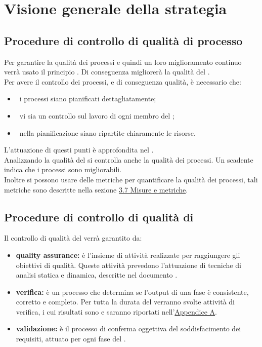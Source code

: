 
\section{Visione generale della strategia}
	\subsection{Procedure di controllo di qualità di processo}
		Per garantire la qualità dei processi e quindi un loro miglioramento continuo verrà usato il principio . Di conseguenza migliorerà la qualità del . \\
		Per avere il controllo dei processi, e di conseguenza qualità, è necessario che:
		\begin{itemize}
			\item\ i processi siano pianificati dettagliatamente;
			\item\ vi sia un controllo sul lavoro di ogni membro del ;
			\item\ nella pianificazione siano ripartite chiaramente le risorse.
		\end{itemize}
		L'attuazione di questi punti è approfondita nel \PPdoc. \\
		Analizzando la qualità del  si controlla anche la qualità dei processi. Un  scadente indica che i processi sono migliorabili. \\
		Inoltre si possono usare delle metriche per quantificare la qualità dei processi, tali metriche sono descritte nella sezione \hyperref[sec:3.7]{3.7 Misure e metriche}.
	\subsection{Procedure di controllo di qualità di }
		Il controllo di qualità del  verrà garantito da:
		\begin{itemize}
			\item \textbf{quality assurance:} è l'insieme di attività realizzate per raggiungere gli obiettivi di qualità. Queste attività prevedono l'attuazione di tecniche di analisi statica e dinamica, descritte nel documento \NPdoc.
			\item \textbf{verifica:} è un processo che determina se l'output di una fase è consistente, corretto e completo. Per tutta la durata del  verranno svolte attività di verifica, i cui risultati sono e saranno riportati nell'\hyperref[sec:A]{Appendice A}.
			\item \textbf{validazione:} è il processo di conferma oggettiva del soddisfacimento dei requisiti, attuato per ogni fase del .
		\end{itemize}
